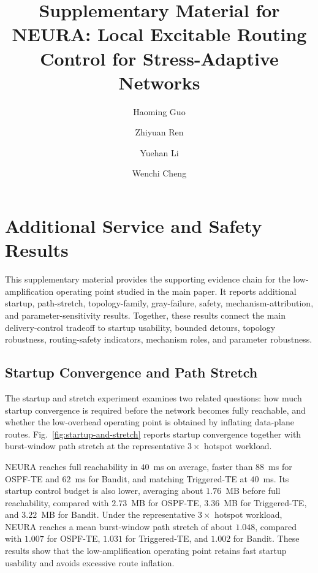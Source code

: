\documentclass[5p,times]{elsarticle}
\begin{document}
\begin{frontmatter}
\title{Supplementary Material for NEURA: Local Excitable Routing Control for Stress-Adaptive Networks}
\author[zky]{Haoming Guo}
\author[xidian]{Zhiyuan Ren}
\author[xidian]{Yuehan Li}
\author[xidian]{Wenchi Cheng}
\address[zky]{Institute of Software, Chinese Academy of Sciences, Beijing 100190, China}
\address[xidian]{School of Telecommunications Engineering, Xidian University, Xi'an 710071, China}
\end{frontmatter}

\section{Additional Service and Safety Results}

This supplementary material provides the supporting evidence chain for the low-amplification operating point studied in the main paper. It reports additional startup, path-stretch, topology-family, gray-failure, safety, mechanism-attribution, and parameter-sensitivity results. Together, these results connect the main delivery-control tradeoff to startup usability, bounded detours, topology robustness, routing-safety indicators, mechanism roles, and parameter robustness.

\subsection{Startup Convergence and Path Stretch}



The startup and stretch experiment examines two related questions: how much startup convergence is required before the network becomes fully reachable, and whether the low-overhead operating point is obtained by inflating data-plane routes. Fig.~\ref{fig:startup-and-stretch} reports startup convergence together with burst-window path stretch at the representative $3\times$ hotspot workload.

NEURA reaches full reachability in $40$~ms on average, faster than $88$~ms for OSPF-TE and $62$~ms for Bandit, and matching Triggered-TE at $40$~ms. Its startup control budget is also lower, averaging about $1.76$~MB before full reachability, compared with $2.73$~MB for OSPF-TE, $3.36$~MB for Triggered-TE, and $3.22$~MB for Bandit. Under the representative $3\times$ hotspot workload, NEURA reaches a mean burst-window path stretch of about $1.048$, compared with $1.007$ for OSPF-TE, $1.031$ for Triggered-TE, and $1.002$ for Bandit. These results show that the low-amplification operating point retains fast startup usability and avoids excessive route inflation.
\end{document}

